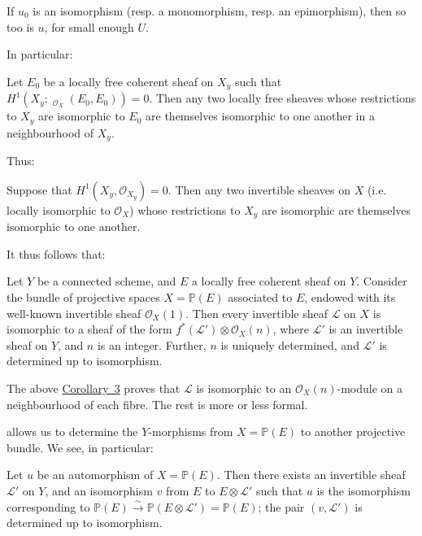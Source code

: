 \documentclass{article}
\theoremstyle{plain}
\newenvironment{proposition}[1]
  {\renewcommand\theinnercustomproposition{#1}\innercustomproposition}
  {\endinnercustomproposition}
\newenvironment{corollary}[1]
  {\renewcommand\theinnercustomcorollary{#1}\innercustomcorollary}
  {\endinnercustomcorollary}
\theoremstyle{definition}
\newcommand{\sh}{\mathscr}
\newcommand{\PP}{\mathbb{P}}
\DeclareMathOperator{\Hom}{Hom}
\DeclareMathOperator{\shHom}{\underline{\Hom}}
\newcommand{\oldpage}[1]{\marginpar{\footnotesize$\Big\vert$ \textit{p.~#1}}}
\begin{document}
\begin{corollary}{1}
\label{theorem7corollary1}
  If $u_0$ is an isomorphism (resp. a monomorphism, resp. an epimorphism), then so too is $u$, for small enough $U$.
\end{corollary}

In particular:

\oldpage{182-10}
\begin{corollary}{2}
\label{theorem7corollary2}
  Let $E_0$ be a locally free coherent sheaf on $X_y$ such that $H^1(X_y;\shHom_{\sh{O}_X}(E_0,E_0))=0$.
  Then any two locally free sheaves whose restrictions to $X_y$ are isomorphic to $E_0$ are themselves isomorphic to one another in a neighbourhood of $X_y$.
\end{corollary}

Thus:

\begin{corollary}{3}
\label{theorem7corollary3}
  Suppose that $H^1(X_y,\sh{O}_{X_y})=0$.
  Then any two invertible sheaves on $X$ (i.e. locally isomorphic to $\sh{O}_X$) whose restrictions to $X_y$ are isomorphic are themselves isomorphic to one another.
\end{corollary}

It thus follows that:

\begin{proposition}{2}
\label{proposition2}
  Let $Y$ be a connected scheme, and $E$ a locally free coherent sheaf on $Y$.
  Consider the bundle of projective spaces $X=\PP(E)$ associated to $E$, endowed with its well-known invertible sheaf $\sh{O}_X(1)$.
  Then every invertible sheaf $\sh{L}$ on $X$ is isomorphic to a sheaf of the form $f^*(\sh{L}')\otimes\sh{O}_X(n)$, where $\sh{L}'$ is an invertible sheaf on $Y$, and $n$ is an integer.
  Further, $n$ is uniquely determined, and $\sh{L}'$ is determined up to isomorphism.
\end{proposition}

The above \hyperref[theorem7corollary3]{Corollary~3} proves that $\sh{L}$ is isomorphic to an $\sh{O}_X(n)$-module on a neighbourhood of each fibre.
The rest is more or less formal.

 allows us to determine the $Y$-morphisms from $X=\PP(E)$ to another projective bundle.
We see, in particular:

\begin{corollary}{1}
\label{proposition2corollary1}
  Let $u$ be an automorphism of $X=\PP(E)$.
  Then there exists an invertible sheaf $\sh{L}'$ on $Y$, and an isomorphism $v$ from $E$ to $E\otimes\sh{L}'$ such that $u$ is the isomorphism corresponding to $\PP(E)\xrightarrow{\sim}\PP(E\otimes\sh{L}')=\PP(E)$;
  the pair $(v,\sh{L}')$ is determined up to isomorphism.
\end{corollary}
\end{document}
